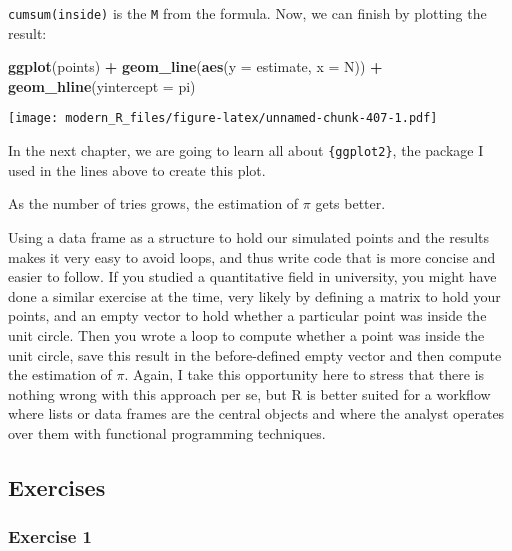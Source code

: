 \documentclass[
]{article}
\newenvironment{Shaded}{\begin{snugshade}}{\end{snugshade}}
\newcommand{\DataTypeTok}[1]{\textcolor[rgb]{0.13,0.29,0.53}{#1}}
\newcommand{\KeywordTok}[1]{\textcolor[rgb]{0.13,0.29,0.53}{\textbf{#1}}}
\newcommand{\NormalTok}[1]{#1}
\newcommand{\OperatorTok}[1]{\textcolor[rgb]{0.81,0.36,0.00}{\textbf{#1}}}
\newcommand{\StringTok}[1]{\textcolor[rgb]{0.31,0.60,0.02}{#1}}
\begin{document}
\texttt{cumsum(inside)} is the \texttt{M} from the formula. Now, we can finish by plotting the result:

\begin{Shaded}
\begin{Highlighting}[]
\KeywordTok{ggplot}\NormalTok{(points) }\OperatorTok{+}
\StringTok{    }\KeywordTok{geom\_line}\NormalTok{(}\KeywordTok{aes}\NormalTok{(}\DataTypeTok{y =}\NormalTok{ estimate, }\DataTypeTok{x =}\NormalTok{ N)) }\OperatorTok{+}
\StringTok{    }\KeywordTok{geom\_hline}\NormalTok{(}\DataTypeTok{yintercept =}\NormalTok{ pi)}
\end{Highlighting}
\end{Shaded}

\texttt{[image: modern\_R\_files/figure-latex/unnamed-chunk-407-1.pdf]}

In the next chapter, we are going to learn all about \texttt{\{ggplot2\}}, the package I used in the lines
above to create this plot.

As the number of tries grows, the estimation of \(\pi\) gets better.

Using a data frame as a structure to hold our simulated points and the results makes it very easy
to avoid loops, and thus write code that is more concise and easier to follow.
If you studied a quantitative field in university, you might have done a similar exercise at the
time, very likely by defining a matrix to hold your points, and an empty vector to hold whether a
particular point was inside the unit circle. Then you wrote a loop to compute whether
a point was inside the unit circle, save this result in the before-defined empty vector and then
compute the estimation of \(\pi\). Again, I take this opportunity here to stress that there is nothing
wrong with this approach per se, but R is better suited for a workflow where lists or data frames
are the central objects and where the analyst operates over them with functional programming techniques.

\hypertarget{exercises-2}{%
\subsection{Exercises}\label{exercises-2}}

\hypertarget{exercise-1-2}{%
\subsubsection*{Exercise 1}\label{exercise-1-2}}
\end{document}
